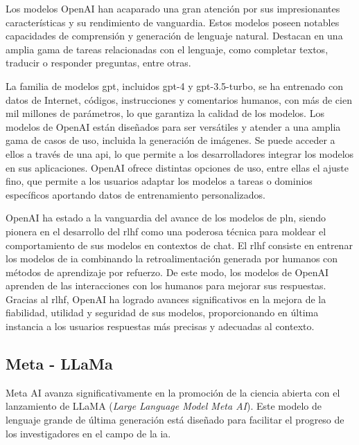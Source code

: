 Los modelos OpenAI han acaparado una gran atención por sus impresionantes características y su rendimiento de vanguardia. Estos modelos poseen notables capacidades de comprensión y generación de lenguaje natural. Destacan en una amplia gama de tareas relacionadas con el lenguaje, como completar textos, traducir o responder preguntas, entre otras.

La familia de modelos \acrshort{gpt}, incluidos gpt-4 y gpt-3.5-turbo, se ha entrenado con datos de Internet, códigos, instrucciones y comentarios humanos, con más de cien mil millones de parámetros, lo que garantiza la calidad de los modelos. Los modelos de OpenAI están diseñados para ser versátiles y atender a una amplia gama de casos de uso, incluida la generación de imágenes. Se puede acceder a ellos a través de una \acrshort{api}, lo que permite a los desarrolladores integrar los modelos en sus aplicaciones. OpenAI ofrece distintas opciones de uso, entre ellas el ajuste fino, que permite a los usuarios adaptar los modelos a tareas o dominios específicos aportando datos de entrenamiento personalizados.


OpenAI ha estado a la vanguardia del avance de los modelos de \acrfull{pln}, siendo pionera en el desarrollo del \acrfull{rlhf} como una poderosa técnica para moldear el comportamiento de sus modelos en contextos de chat. El \acrshort{rlhf} consiste en entrenar los modelos de \acrshort{ia} combinando la retroalimentación generada por humanos con métodos de aprendizaje por refuerzo. De este modo, los modelos de OpenAI aprenden de las interacciones con los humanos para mejorar sus respuestas. Gracias al \acrshort{rlhf}, OpenAI ha logrado avances significativos en la mejora de la fiabilidad, utilidad y seguridad de sus modelos, proporcionando en última instancia a los usuarios respuestas más precisas y adecuadas al contexto.

\subsection{Meta - LLaMa}

Meta AI avanza significativamente en la promoción de la ciencia abierta con el lanzamiento de LLaMA (\textit{Large Language Model Meta AI}). Este modelo de lenguaje grande de última generación está diseñado para facilitar el progreso de los investigadores en el campo de la \acrshort{ia}.

